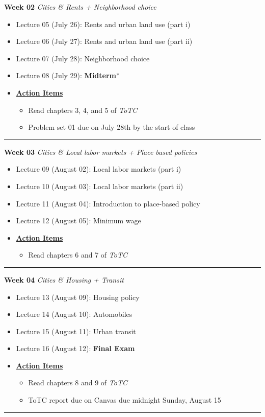 \documentclass[11pt]{article}
\begin{document}
	\textbf{Week 02} \textit{Cities \& Rents + Neighborhood choice}
	\begin{itemize}
		\item Lecture 05 (July 26): Rents and urban land use (part i)
		\item Lecture 06 (July 27): Rents and urban land use (part ii)
		\item Lecture 07 (July 28): Neighborhood choice 
		\item Lecture 08 (July 29):  \textbf{Midterm}*
		\item[]\underline{\textbf{Action Items}}
		\begin{itemize}
				\item Read chapters 3, 4, and 5 of \textit{ToTC}
				\item Problem set 01 due on July 28th by the start of class
		\end{itemize}
	\end{itemize}
	\noindent\rule[0.5ex]{\linewidth}{1pt}
	
		\textbf{Week 03} \textit{Cities \& Local labor markets + Place based policies}
	\begin{itemize}
		\item Lecture 09 (August 02): Local labor markets (part i)
		\item Lecture 10 (August 03): Local labor markets (part ii)
		\item Lecture 11 (August 04): Introduction to place-based policy
		\item Lecture 12 (August 05): Minimum wage
		\item[]\underline{\textbf{Action Items}}
		\begin{itemize}
				\item Read chapters 6 and 7 of \textit{ToTC}
		\end{itemize}
	\end{itemize}
	\noindent\rule[0.5ex]{\linewidth}{1pt}
	
		\textbf{Week 04} \textit{Cities \& Housing + Transit}
	\begin{itemize}
		\item Lecture 13 (August 09): Housing policy
		\item Lecture 14 (August 10): Automobiles
		\item Lecture 15 (August 11): Urban transit
		\item Lecture 16 (August 12):  \textbf{Final Exam}
		\item[]\underline{\textbf{Action Items}}
		\begin{itemize}
				\item Read chapters 8 and 9 of \textit{ToTC}
				\item ToTC report due on Canvas due midnight Sunday, August 15
		\end{itemize}
	\end{itemize}
	\noindent\rule[0.5ex]{\linewidth}{1pt}
	
\end{document}
